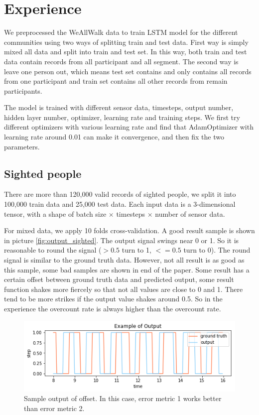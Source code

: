 \documentclass[11pt]{article}
\begin{document}
{\section{Experience}

We preprocessed the WeAllWalk data to train LSTM model for the different communities using two ways of splitting train and test data. First way is simply mixed all data and split into train and test set. In this way, both train and test data contain records from all participant and all  segment. The second way is leave one person out, which means test set contains and only contains all records from one participant and train set contains all other records from remain participants.

The model is trained with different sensor data, timesteps, output number, hidden layer number, optimizer, learning rate and training steps. We first try different optimizers with various learning rate and find that AdamOptimizer with learning rate around 0.01 can make it convergence, and then fix the two parameters. 


\subsection{Sighted people}
There are more than 120,000  valid records of sighted people, we split it into 100,000 train data and 25,000 test data. Each input data is a 3-dimensional tensor, with a shape of batch size $\times$ timesteps $\times$ number of sensor data.

For mixed data, we apply 10 folds cross-validation. A good result sample is shown in picture \ref{fig:output_sighted}. The output signal swings near 0 or 1. So it is reasonable to round the signal ($>0.5$ turn to 1, $<=0.5$ turn to 0). The round signal is similar to the ground truth data. However, not all result is as good as this sample, some bad samples are shown in end of the paper. Some result has a certain offset between ground truth data and predicted output, some result function shakes more fiercely so that not all values are close to 0 and 1. There tend to be more strikes if the output value shakes around 0.5. So in the experience the overcount rate is always higher than the overcount rate.

\begin{figure}[ht]
\centering
\includegraphics[scale=0.4]{output_ex_offset}
\caption{Sample output of offset. In this case, error metric 1 works better than error metric 2.}
\label{fig:output_ex_offset}
\end{figure}


}
\end{document}
